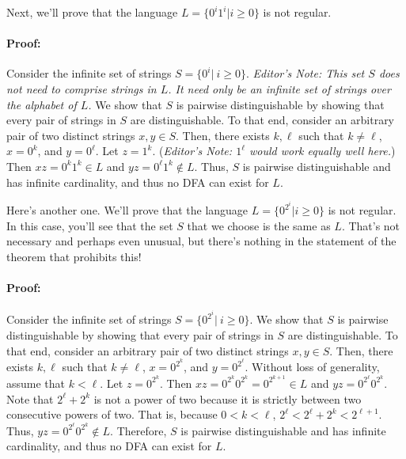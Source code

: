 \documentclass[12pt]{article}
\begin{document}
Next, we'll prove that the language $L = \{ 0^i 1^i | i \geq 0 \}$ is not regular.

\paragraph{Proof:}  Consider the infinite set of strings $S = \{ 0^i | \  i \geq 0 \}$.  \emph{Editor's Note:  This set $S$ does not need to comprise strings in $L$.  It need only be an infinite set of strings over the alphabet of $L$.}  We show that $S$ is pairwise distinguishable by showing that every pair of strings in $S$ are distinguishable. 
To that end, consider an arbitrary pair of two distinct strings $x, y\in S$.
Then, there exists $k, \ell$ such that $k \neq \ell$, $x = 0^k$, and $y = 0^{\ell}$.  Let $z = 1^k$.  (\emph{Editor's Note:  $1^{\ell}$ would work equally well here.})
Then $xz = 0^k1^k \in L$ and $yz = 0^{\ell}1^k \notin L$.  Thus, $S$ is pairwise distinguishable and has infinite cardinality, and thus no DFA can exist for $L$.

\vspace{0.5cm}

Here's another one. We'll prove that the language $L = \{0^{2^i} | i \geq 0 \}$ is not regular.
In this case, you'll see that the set $S$ that we choose is the same as $L$.  That's not necessary and perhaps even unusual, but there's nothing in the statement of the theorem that prohibits this!

\paragraph{Proof:}  Consider the infinite set of strings $S = \{ 0^{2^i} | \  i \geq 0 \}$.   We show that $S$ is pairwise distinguishable by showing that every pair of strings in $S$ are distinguishable. 
To that end, consider an arbitrary pair of two distinct strings $x, y\in S$.
Then, there exists $k, \ell$ such that $k \neq \ell$, $x = 0^{2^k}$, and $y = 0^{2^{\ell}}$.  Without loss of generality, assume that $k < \ell$.  Let $z =0^{2^k}$.  
Then $xz = 0^{2^k}  0^{2^{k}} = 0^{2^{k+1}} \in L$ and $yz = 0^{2^{\ell}} 0^{2^{k}}$.  Note that $2^{\ell} + 2^k$ is not a power of two because it is strictly between two consecutive powers of two.  That is,  because $0 < k < \ell$, $2^{\ell}  < 2^{\ell} + 2^k  < 2^{\ell + 1}$.  
Thus,  $yz = 0^{2^{\ell}} 0^{2^{k}} \notin L$.  Therefore, $S$ is pairwise distinguishable and has infinite cardinality, and thus no DFA can exist for $L$.
\end{document}
